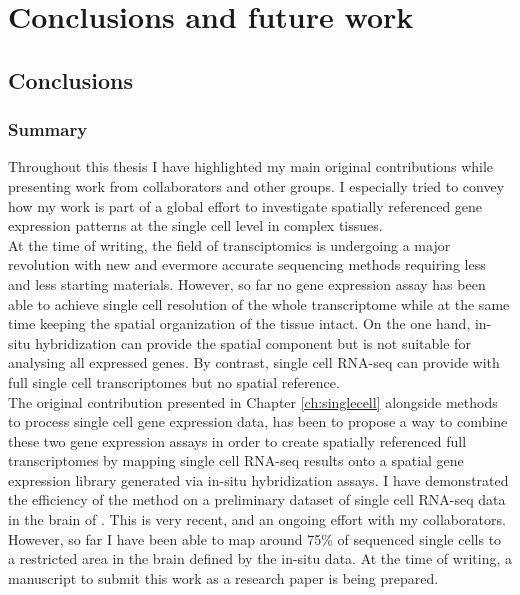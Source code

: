 \chapter{Conclusions and future work}\label{ch:conclusions}

\section{Conclusions}

	\subsection{Summary}
	
Throughout this thesis I have highlighted my main original contributions while presenting work from collaborators and other groups. I especially tried to convey how my work is part of a global effort to investigate spatially referenced gene expression patterns at the single cell level in complex tissues.\\

At the time of writing, the field of transciptomics is undergoing a major revolution with new and evermore accurate sequencing methods requiring less and less starting materials. However, so far no gene expression assay has been able to achieve single cell resolution of the whole transcriptome while at the same time keeping the spatial organization of the tissue intact. On the one hand, in-situ hybridization can provide the spatial component but is not suitable for analysing all expressed genes. By contrast, single cell RNA-seq can provide with full single cell transcriptomes but no spatial reference.\\

The original contribution presented in Chapter \ref{ch:singlecell} alongside methods to process single cell gene expression data, has been to propose a way to combine these two gene expression assays in order to create spatially referenced full transcriptomes by mapping single cell RNA-seq results onto a spatial gene expression library generated via in-situ hybridization assays. I have demonstrated the efficiency of the method on a preliminary dataset of single cell RNA-seq data in the brain of \platy{}. This is very recent, and an ongoing effort with my collaborators. However, so far I have been able to map around 75\% of sequenced single cells to a restricted area in the brain defined by the in-situ data. At the time of writing, a manuscript to submit this work as a research paper is being prepared.\\


